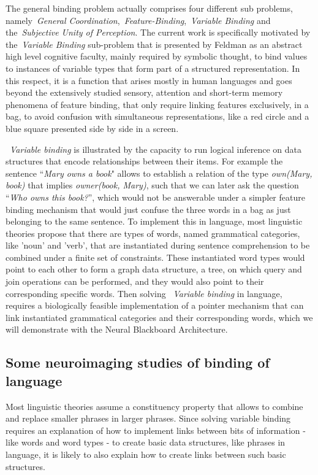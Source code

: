 \documentclass[10pt]{article}
\begin{document}
The general binding problem actually comprises four different sub problems, namely~\emph{General Coordination},~\emph{Feature-Binding},~\emph{Variable Binding} and the~\emph{Subjective Unity of Perception}\cite{Feldman_2012}.
The current work is specifically motivated by the~\emph{Variable Binding} sub-problem that is presented by Feldman as an abstract high level cognitive faculty, mainly required by symbolic thought, to bind values to instances of variable types that form part of a structured representation.
In this respect, it is a function that arises mostly in human languages and goes beyond the extensively studied sensory, attention and short-term memory phenomena of feature binding, that only require linking features exclusively, in a bag, to avoid confusion with simultaneous representations, like a red circle and a blue square presented side by side in a screen.

~\emph{Variable binding} is illustrated by the capacity to run logical inference on data structures that encode relationships between their items.
For example the sentence ``\emph{Mary owns a book}" allows to establish a relation of the type \emph{own(Mary, book)} that implies \emph{owner(book, Mary)}, such that we can later ask the question ``\emph{Who owns this book?}'', which would not be answerable under a simpler feature binding mechanism that would just confuse the three words in a bag as just belonging to the same sentence.
To implement this in language, most linguistic theories propose that there are types of words, named grammatical categories, like 'noun' and 'verb', that are instantiated during sentence comprehension to be combined under a finite set of constraints.
These instantiated word types would point to each other to form a graph data structure, a tree, on which query and join operations can be performed, and they would also point to their corresponding specific words.
Then solving ~\emph{Variable binding} in language, requires a biologically feasible implementation of a pointer mechanism that can link instantiated grammatical categories and their corresponding words, which we will demonstrate with the Neural Blackboard Architecture.


\subsection{Some neuroimaging studies of binding of language}

{\label{729344}}

Most linguistic theories assume a constituency property that allows to combine and replace smaller phrases in larger phrases.
Since solving variable binding requires an explanation of how to implement links between bits of information - like words and word types - to create basic data structures, like phrases in language, it is likely to also explain how to create links between such basic structures.
\end{document}

